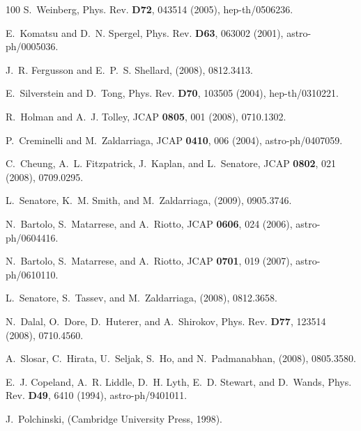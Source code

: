 \documentclass[12pt,letterpaper,rotate]{article}
\begin{document}
{\begin{thebibliography}{100}
S.~Weinberg,
\newblock Phys. Rev. {\bf D72}, 043514 (2005), hep-th/0506236.

E.~Komatsu and D.~N. Spergel,
\newblock Phys. Rev. {\bf D63}, 063002 (2001), astro-ph/0005036.

J.~R. Fergusson and E.~P.~S. Shellard,
\newblock (2008), 0812.3413.

E.~Silverstein and D.~Tong,
\newblock Phys. Rev. {\bf D70}, 103505 (2004), hep-th/0310221.

R.~Holman and A.~J. Tolley,
\newblock JCAP {\bf 0805}, 001 (2008), 0710.1302.

P.~Creminelli and M.~Zaldarriaga,
\newblock JCAP {\bf 0410}, 006 (2004), astro-ph/0407059.

C.~Cheung, A.~L. Fitzpatrick, J.~Kaplan, and L.~Senatore,
\newblock JCAP {\bf 0802}, 021 (2008), 0709.0295.

L.~Senatore, K.~M. Smith, and M.~Zaldarriaga,
\newblock (2009), 0905.3746.

N.~Bartolo, S.~Matarrese, and A.~Riotto,
\newblock JCAP {\bf 0606}, 024 (2006), astro-ph/0604416.

N.~Bartolo, S.~Matarrese, and A.~Riotto,
\newblock JCAP {\bf 0701}, 019 (2007), astro-ph/0610110.

L.~Senatore, S.~Tassev, and M.~Zaldarriaga,
\newblock (2008), 0812.3658.

N.~Dalal, O.~Dore, D.~Huterer, and A.~Shirokov,
\newblock Phys. Rev. {\bf D77}, 123514 (2008), 0710.4560.

A.~Slosar, C.~Hirata, U.~Seljak, S.~Ho, and N.~Padmanabhan,
\newblock (2008), 0805.3580.

E.~J. Copeland, A.~R. Liddle, D.~H. Lyth, E.~D. Stewart, and D.~Wands,
\newblock Phys. Rev. {\bf D49}, 6410 (1994), astro-ph/9401011.

J.~Polchinski,
  (Cambridge University Press, 1998).


\end{thebibliography}}
\end{document}
